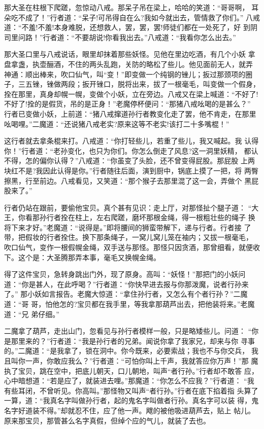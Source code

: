 那大圣在柱根下爬蹉，忽惊动八戒。那呆子吊在梁上，哈哈的笑道：“哥哥啊，
耳朵吃不成了！”行者道：“呆子!可吊得自在么?我如今就出去，管情救了你们。”
八戒道：“不羞!不羞!本身难脱，还想救人，罢，罢，罢!师徒们都在一处死了，好
到阴司里问路！”行者道：“不要胡说!你看我出去。”八戒道：“我看你怎么出去。”

那大圣口里与八戒说话，眼里却抹着那些妖怪。见他在里边吃酒，有几个小妖
拿盘拿盏，执壶酾酒，不住的两头乱跑，关防的略松了些儿。他见面前无人，就弄
神通：顺出棒来，吹口仙气，叫“变！”即变做一个纯钢的锉儿；扳过那颈项的圈
子，三五锉，锉做两段；扳开锉口，脱将出来，拔了一根毫毛，叫变做一个假身，
拴在那里，真身却幌一幌，变做个小妖，立在旁边。八戒又在梁上喊道：“不好了!
不好了!拴的是假货，吊的是正身！”老魔停杯便问：“那猪八戒吆喝的是甚么？”
行者已变做小妖，上前道：“猪八戒撺道孙行者教变化走了罢，他不肯走，在那里
吆喝哩。”二魔道：“还说猪八戒老实?原来这等不老实!该打二十多嘴棍！”

这行者就去拿条棍来打。八戒道：“你打轻些儿，若重了些儿，我又喊起。我
认得你！”行者道：“老孙变化，也只为你们。你怎么倒走了风息?这一洞里妖精，
都认不得，怎的偏你认得？”八戒道：“你虽变了头脸，还不曾变得屁股。那屁股
上两块红不是?我因此认得是你。”行者随往后面，演到厨中，锅底上摸了一把，将
两臀擦黑，行至前边。八戒看见，又笑道：“那个猴子去那里混了这一会，弄做个
黑屁股来了。”

行者仍站在跟前，要偷他宝贝。真个甚有见识：走上厅，对那怪扯个腿子道：
“大王，你看那孙行者拴在柱上，左右爬蹉，磨坏那根金绳，得一根粗壮些的绳子
换将下来才好。”老魔道：“说得是。”即将腰间的狮蛮带解下，递与行者。行者接
了带，把假妆的行者拴住。换下那条绳子，一窝儿窝儿笼在袖内；又拔一根毫毛，
吹口仙气，变作一根假幌金绳，双手送与那怪。那怪只因贪酒，那曾细看，就便收
下。这个是：大圣腾那弄本事，毫毛又换幌金绳。

得了这件宝贝，急转身跳出门外，现了原身。高叫：“妖怪！”那把门的小妖问
道：“你是甚人，在此呼喝？”行者道：“你快早进去报与你那泼魔，说者行孙来了。”
那小妖如言报告。老魔大惊道：“拿住孙行者，又怎么有个者行孙？”二魔道：“哥
哥，怕他怎的?宝贝都在我手里，等我拿那葫芦出去，把他装将来。”老魔道：“兄
弟仔细。”

二魔拿了葫芦，走出山门，忽看见与孙行者模样一般，只是略矮些儿。问道：
“你是那里来的？”行者道：“我是孙行者的兄弟。闻说你拿了我家兄，却来与你
寻事的。”二魔道：“是我拿了，锁在洞中。你今既来，必要索战；我也不与你交兵，
我且叫你一声，你敢应我么？”行者道：“可怕你叫上千声，我就答应你万声！”那
魔执了宝贝，跳在空中，把底儿朝天，口儿朝地，叫声“者行孙。”行者却不敢答
应，心中暗想道：“若是应了，就装进去哩。”那魔道：“你怎么不应我？”行者道：
“我有些耳闭，不曾听见。你高叫。”那怪物又叫声“者行孙。”行者在底下掐着指
头算了一算，道：“我真名字叫做孙行者，起的鬼名字叫做者行孙。真名字可以装
得，鬼名字好道装不得。”却就忍不住，应了他一声。飕的被他吸进葫芦去，贴上
帖儿。原来那宝贝，那管甚么名字真假，但绰个应的气儿，就装了去也。

